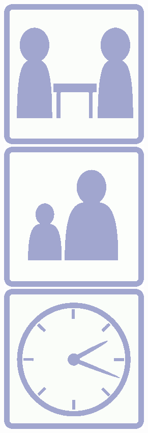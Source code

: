 \documentclass[a5paper, DIV=18, 12pt]{scrartcl}
\begin{document}
\includegraphics[scale=0.125]{Images/Icons/player_count_icon_purple.png} {\setmainfont[Scale=1.25]{Fredoka-Bold}\Huge \raisebox{6.55pt}{\textcolor{SunriseBlue}{:\ 1-5}}} \hfill \includegraphics[scale=0.125]{Images/Icons/player_age_icon_purple.png} {\setmainfont[Scale=1.125]{Fredoka-Bold}\Huge \raisebox{6.55pt}{\textcolor{SunriseBlue}{:\ 8+}}}\hfill \includegraphics[scale=0.125]{Images/Icons/playtime_icon_purple.png} {\setmainfont[Scale=1.125]{Fredoka-Bold}\Huge \raisebox{6.55pt}{\textcolor{SunriseBlue}{:\ 20-30}}}
\end{document}
